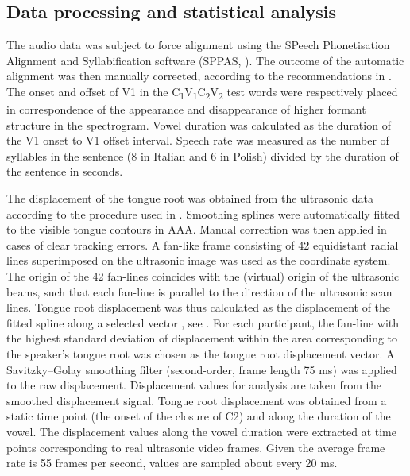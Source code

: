 \documentclass[
  12pt,
]{article}
\begin{document}
\hypertarget{data-processing-and-statistical-analysis}{%
\subsection{Data processing and statistical
analysis}\label{data-processing-and-statistical-analysis}}

\label{s:process}

The audio data was subject to force alignment using the SPeech
Phonetisation Alignment and Syllabification software (SPPAS,
\citealt{bigi2015}). The outcome of the automatic alignment was then
manually corrected, according to the recommendations in
\citet{machac2009}. The onset and offset of V1 in the
C\textsubscript{1}V\textsubscript{1}C\textsubscript{2}V\textsubscript{2}
test words were respectively placed in correspondence of the appearance
and disappearance of higher formant structure in the spectrogram. Vowel
duration was calculated as the duration of the V1 onset to V1 offset
interval. Speech rate was measured as the number of syllables in the
sentence (8 in Italian and 6 in Polish) divided by the duration of the
sentence in seconds.

The displacement of the tongue root was obtained from the ultrasonic
data according to the procedure used in \citet{kirkham2017}. Smoothing
splines were automatically fitted to the visible tongue contours in AAA.
Manual correction was then applied in cases of clear tracking errors. A
fan-like frame consisting of 42 equidistant radial lines superimposed on
the ultrasonic image was used as the coordinate system. The origin of
the 42 fan-lines coincides with the (virtual) origin of the ultrasonic
beams, such that each fan-line is parallel to the direction of the
ultrasonic scan lines. Tongue root displacement was thus calculated as
the displacement of the fitted spline along a selected vector
\citep{strycharczuk2015}, see . For each participant, the
fan-line with the highest standard deviation of displacement within the
area corresponding to the speaker's tongue root was chosen as the tongue
root displacement vector. A Savitzky--Golay smoothing filter
(second-order, frame length 75 ms) was applied to the raw displacement.
Displacement values for analysis are taken from the smoothed
displacement signal. Tongue root displacement was obtained from a static
time point (the onset of the closure of C2) and along the duration of
the vowel. The displacement values along the vowel duration were
extracted at time points corresponding to real ultrasonic video frames.
Given the average frame rate is 55 frames per second, values are sampled
about every 20 ms.
\end{document}
